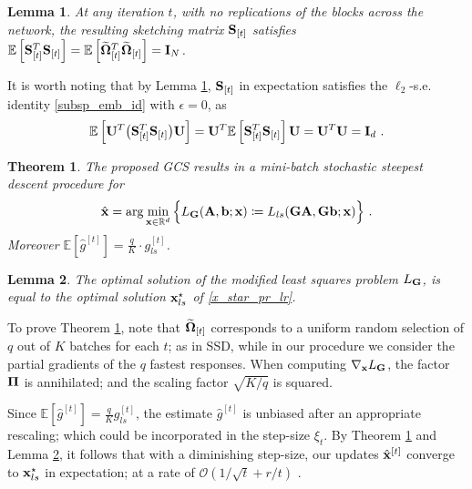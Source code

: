 \documentclass[journal,letterpaper,onecolumn,twoside,nofonttune]{IEEEtran}
\newcommand{\ow}{\mathcal{O}}
\newcommand{\Ub}{\bold{U}}
\newcommand{\xb}{\bold{x}}
\newcommand{\xbh}{{\hat{\bold{x}}}}
\newcommand{\Gb}{\bold{G}}
\newcommand{\Pibold}{\bold{\Pi}}
\newcommand{\Omb}{\bold{\Omega}}
\newcommand{\Ombwt}{\widetilde{\Omb}}
\newcommand{\R}{\mathbb{R}}
\newcommand{\E}{\mathbb{E}}
\newcommand{\gh}{\hat{g}}
\newcommand{\Sb}{\bold{S}}
\newcommand{\Ab}{\bold{A}}
\newcommand{\bb}{\bold{b}}
\newcommand{\Ib}{\bold{I}}
\newtheorem{Thm}{Theorem}
\newtheorem{Lemma}{Lemma}
\begin{document}
\begin{Lemma}
\label{lemma_exp}
At any iteration $t$, with no replications of the blocks across the network, the resulting sketching matrix $\Sb_{[t]}$ satisfies $\E\left[\Sb_{[t]}^T\Sb_{[t]}\right]=\E\left[\Ombwt_{[t]}^T\Ombwt_{[t]}\right]=\Ib_N$.
\end{Lemma}

It is worth noting that by Lemma \ref{lemma_exp}, $\Sb_{[t]}$ in expectation satisfies the $\ell_2$-s.e. identity \eqref{subsp_emb_id} with $\epsilon=0$, as $$ \E\left[\Ub^T\big(\Sb_{[t]}^T\Sb_{[t]}\big)\Ub\right]=\Ub^T\E\left[\Sb_{[t]}^T\Sb_{[t]}\right]\Ub=\Ub^T\Ub=\Ib_d\ . $$

\begin{Thm}
\label{GC_SGD_thm}
The proposed GCS results in a mini-batch stochastic steepest descent procedure for
\begin{equation}
\label{mod_pr_G}
  \xbh = \arg\min_{\xb\in\R^d}\Big\{L_{\Gb}(\Ab,\bb;\xb)\coloneqq L_{ls}(\Gb\Ab,\Gb\bb;\xb)\Big\} \ .
\end{equation}
Moreover $\E\left[\gh^{[t]}\right]=\frac{q}{K}\cdot g_{ls}^{[t]}$.
\end{Thm}

\begin{Lemma}
\label{eq_opt_sols}  %
The optimal solution of the modified least squares problem $L_{\Gb}$, is equal to the optimal solution $\xb_{ls}^{\star}$ of \eqref{x_star_pr_lr}.
\end{Lemma}

To prove Theorem \ref{GC_SGD_thm}, note that $\Ombwt_{[t]}$ corresponds to a uniform random selection of $q$ out of $K$ batches for each $t$; as in SSD, while in our procedure we consider the partial gradients of the $q$ fastest responses. When computing $\nabla_{\xb}L_\Gb$, the factor $\Pibold$ is annihilated; and the scaling factor $\sqrt{K/q}$ is squared. %

Since $\E\left[\gh^{[t]}\right]=\frac{q}{K} g_{ls}^{[t]}$, the estimate $\gh^{[t]}$ is unbiased after an appropriate rescaling; which could be incorporated in the step-size $\xi_t$. By Theorem \ref{GC_SGD_thm} and Lemma \ref{eq_opt_sols}, it follows that with a diminishing step-size, our updates $\xbh^{[t]}$ converge to $\xb_{ls}^{\star}$ in expectation; at a rate of $\ow(1/\sqrt{t}+r/t)$ \cite{DGSX12,Bub15}.
\end{document}
